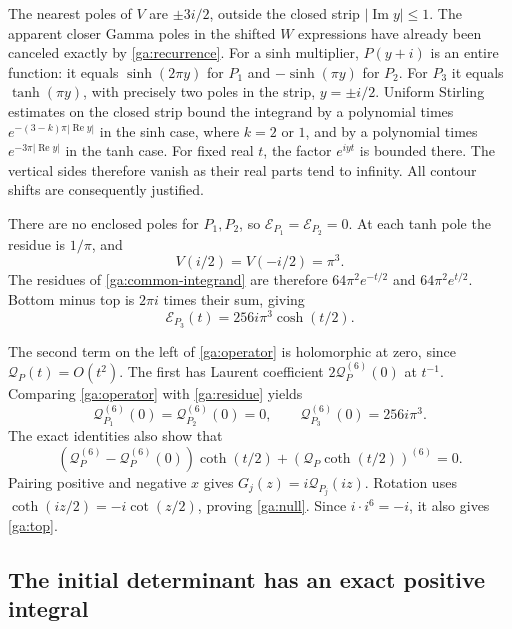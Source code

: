 The nearest poles of $V$ are $\pm3i/2$, outside the closed strip
$|\operatorname{Im}y|\le1$.  The apparent closer Gamma poles in
the shifted $W$ expressions have already been canceled exactly
by \eqref{ga:recurrence}.  For a sinh multiplier, $P(y+i)$ is
an entire function: it equals $\sinh(2\pi y)$ for $P_1$ and
$-\sinh(\pi y)$ for $P_2$.  For $P_3$ it equals
$\tanh(\pi y)$, with precisely two poles in the strip,
$y=\pm i/2$.
Uniform Stirling estimates on the closed strip bound the integrand
by a polynomial times $e^{-(3-k)\pi|\operatorname{Re}y|}$ in
the sinh case, where $k=2$ or $1$, and by a polynomial times
$e^{-3\pi|\operatorname{Re}y|}$ in the tanh case.
For fixed real $t$, the factor $e^{iyt}$ is bounded there.
The vertical sides therefore vanish as their real parts tend to
infinity.  All contour shifts are consequently justified.

There are no enclosed poles for $P_1,P_2$, so
$\mathcal E_{P_1}=\mathcal E_{P_2}=0$.
At each tanh pole the residue is $1/\pi$, and
\[
                         V(i/2)=V(-i/2)=\pi^3.
\]
The residues of \eqref{ga:common-integrand} are therefore
$64\pi^2e^{-t/2}$ and $64\pi^2e^{t/2}$.  Bottom minus top is
$2\pi i$ times their sum, giving
\begin{equation}\label{ga:residue}
                \mathcal E_{P_3}(t)=256i\pi^3\cosh(t/2).
\end{equation}

The second term on the left of \eqref{ga:operator} is holomorphic
at zero, since $\mathcal Q_P(t)=O(t^2)$.  The first has Laurent
coefficient $2\mathcal Q_P^{(6)}(0)$ at $t^{-1}$.
Comparing \eqref{ga:operator} with \eqref{ga:residue} yields
\[
 \mathcal Q_{P_1}^{(6)}(0)=\mathcal Q_{P_2}^{(6)}(0)=0,
 \qquad\mathcal Q_{P_3}^{(6)}(0)=256i\pi^3.
\]
The exact identities also show that
\[
 (\mathcal Q_P^{(6)}-\mathcal Q_P^{(6)}(0))\coth(t/2)
                   +(\mathcal Q_P\coth(t/2))^{(6)}=0.
\]
Pairing positive and negative $x$ gives
$G_j(z)=i\mathcal Q_{P_j}(iz)$.  Rotation uses
$\coth(iz/2)=-i\cot(z/2)$, proving \eqref{ga:null}.
Since $i\cdot i^6=-i$, it also gives \eqref{ga:top}.

\subsection{The initial determinant has an exact positive integral}

